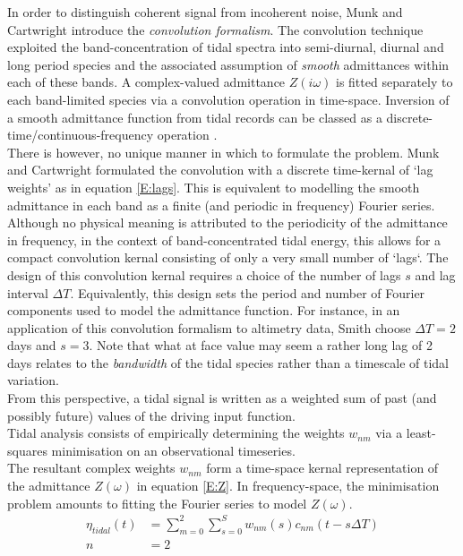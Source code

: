 In order to distinguish coherent signal from incoherent noise, Munk and Cartwright introduce the \emph{convolution formalism}. The convolution technique exploited the band-concentration of tidal spectra into semi-diurnal, diurnal and long period species and the associated assumption of \emph{smooth} admittances within each of these bands.  A complex-valued admittance $Z(i\omega)$ is fitted separately to each band-limited species via a convolution operation in time-space. 
Inversion of a smooth admittance function from tidal records can be classed as a discrete-time/continuous-frequency operation \citep{Percival:1998tw}.\\

There is however, no unique manner in which to formulate the problem.  Munk and Cartwright formulated the convolution with a discrete time-kernal of `lag weights' as in equation \ref{E:lags}.   This is equivalent to modelling the smooth admittance in each band as a finite (and periodic in frequency) Fourier series.   Although no physical meaning is attributed to the periodicity of the admittance in frequency, in the context of band-concentrated tidal energy, this allows for a compact convolution kernal consisting of only a very small number of `lags`.   The design of this convolution kernal requires a choice of the number of lags $s$ and lag interval $\Delta T$.  Equivalently, this design sets the period and number of Fourier components used to model the admittance function.  For instance, in an application of this convolution formalism to altimetry data, Smith \citep{Smith:1997ut} choose $\Delta T=2$ days and $s=3$.   Note that what at face value may seem a rather long lag of 2 days relates to the \emph{bandwidth} of the tidal species rather than a timescale of tidal variation.\\
From this perspective, a tidal signal is written as a weighted sum of past (and possibly future) values of the driving input function.  \\ 
Tidal analysis consists of empirically determining the weights $w_{nm}$ via a least-squares minimisation on an observational timeseries.\\
The resultant complex weights $w_{nm}$ form a time-space kernal representation of the admittance $Z(\omega)$ in equation \ref{E:Z}.   In frequency-space, the minimisation problem amounts to fitting the Fourier series to model $Z(\omega)$.\\

\begin{align}
\label{E:lags}
\eta_{tidal}(t) &= \sum_{m=0}^{2}\sum_{s=0}^{S} w_{nm}(s)c_{nm}(t-s\Delta T)\\
              n &= 2   \nonumber
\end{align}

